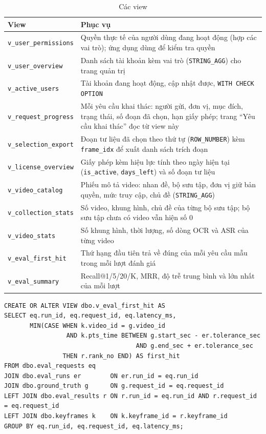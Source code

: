 \begin{table}[H]
\centering
\caption{Các view}
\label{tab:views}
\renewcommand{\arraystretch}{1.15}
\begin{tabularx}{\textwidth}{>{\raggedright\arraybackslash}p{4.2cm} >{\raggedright\arraybackslash}X}
\toprule
\textbf{View} & \textbf{Phục vụ} \\
\midrule
\texttt{v\_user\_permissions} & Quyền thực tế của người dùng đang hoạt động (hợp các vai trò); ứng dụng dùng để kiểm tra quyền \\
\texttt{v\_user\_overview} & Danh sách tài khoản kèm vai trò (\texttt{STRING\_AGG}) cho trang quản trị \\
\texttt{v\_active\_users} & Tài khoản đang hoạt động, cập nhật được, \texttt{WITH CHECK OPTION} \\
\texttt{v\_request\_progress} & Mỗi yêu cầu khai thác: người gửi, đơn vị, mục đích, trạng thái, số đoạn đã chọn, hạn giấy phép; trang ``Yêu cầu khai thác'' đọc từ view này \\
\texttt{v\_selection\_export} & Đoạn tư liệu đã chọn theo thứ tự (\texttt{ROW\_NUMBER}) kèm \texttt{frame\_idx} để xuất danh sách trích đoạn \\
\texttt{v\_license\_overview} & Giấy phép kèm hiệu lực tính theo ngày hiện tại (\texttt{is\_active}, \texttt{days\_left}) và số đoạn tư liệu \\
\texttt{v\_video\_catalog} & Phiếu mô tả video: nhan đề, bộ sưu tập, đơn vị giữ bản quyền, mức truy cập, chủ đề (\texttt{STRING\_AGG}) \\
\texttt{v\_collection\_stats} & Số video, khung hình, chủ đề của từng bộ sưu tập; bộ sưu tập chưa có video vẫn hiện số 0 \\
\texttt{v\_video\_stats} & Số khung hình, thời lượng, số dòng OCR và ASR của từng video \\
\texttt{v\_eval\_first\_hit} & Thứ hạng đầu tiên trả về đúng của mỗi yêu cầu mẫu trong mỗi lượt đánh giá \\
\texttt{v\_eval\_summary} & Recall@1/5/20/K, MRR, độ trễ trung bình và lớn nhất của mỗi lượt \\
\bottomrule
\end{tabularx}
\end{table}

\begin{lstlisting}[caption={View xác định thứ hạng trúng đầu tiên}, label={lst:first_hit}]
CREATE OR ALTER VIEW dbo.v_eval_first_hit AS
SELECT eq.run_id, eq.request_id, eq.latency_ms,
       MIN(CASE WHEN k.video_id = g.video_id
                 AND k.pts_time BETWEEN g.start_sec - er.tolerance_sec
                                    AND g.end_sec + er.tolerance_sec
                THEN r.rank_no END) AS first_hit
FROM dbo.eval_requests eq
JOIN dbo.eval_runs er        ON er.run_id = eq.run_id
JOIN dbo.ground_truth g      ON g.request_id = eq.request_id
LEFT JOIN dbo.eval_results r ON r.run_id = eq.run_id AND r.request_id = eq.request_id
LEFT JOIN dbo.keyframes k    ON k.keyframe_id = r.keyframe_id
GROUP BY eq.run_id, eq.request_id, eq.latency_ms;
\end{lstlisting}


